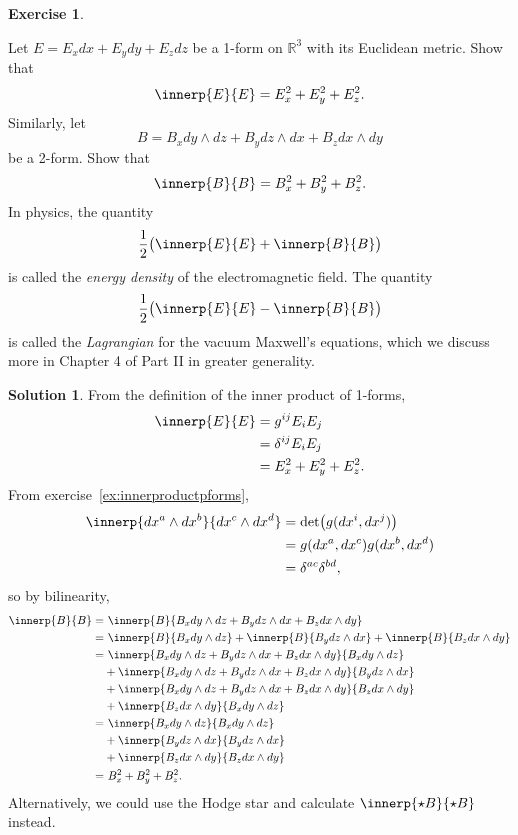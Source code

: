 \documentclass[11pt, a4paper]{report}
\theoremstyle{definition}
\newtheorem{ex}{Exercise}[part]
\newtheorem{sol}{Solution}[part]
\begin{document}
\begin{ex}\label{ex:esquaredbsquared}

Let $E = E_x dx + E_y dy + E_z dz$ be a 1-form on $\mathbb{R}^3$ with its Euclidean metric. Show that
\[
    \innerp{E}{E} = E_x^2 + E_y^2 + E_z^2.
\]
Similarly, let
\[
    B = B_x dy \wedge dz + B_y dz \wedge dx + B_z dx \wedge dy
\]
be a 2-form. Show that
\[
    \innerp{B}{B} = B_x^2 + B_y^2 + B_z^2.
\]
In physics, the quantity
\[
    \frac{1}{2} \bigl( \innerp{E}{E} + \innerp{B}{B} \bigr)
\]
is called the \emph{energy density} of the electromagnetic field. The quantity
\[
    \frac{1}{2} \bigl( \innerp{E}{E} - \innerp{B}{B} \bigr) \label{eq:lagrangianvacuumem}
\]
is called the \emph{Lagrangian} for the vacuum Maxwell's equations, which we discuss more in Chapter 4 of Part II in greater generality.

\end{ex}

\begin{sol}

From the definition of the inner product of 1-forms,
\begin{align*}
    \innerp{E}{E} &= g^{ij} E_i E_j \\
                  &= \delta^{ij} E_i E_j \\
                  &= E_x^2 + E_y^2 + E_z^2.
\end{align*}
From exercise~\ref{ex:innerproductpforms},
\begin{align*}
    \innerp{dx^a \wedge dx^b}{dx^c \wedge dx^d} &= \det \bigl(g(dx^i, dx^j)\bigr) \\
        &= g(dx^a, dx^c) g(dx^b, dx^d) \\
        &= \delta^{ac} \delta^{bd},
\end{align*}
so by bilinearity,
\begin{align*}
    \innerp{B}{B} =&\ \innerp{B}{B_x dy \wedge dz + B_y dz \wedge dx + B_z dx \wedge dy} \\
        =&\ \innerp{B}{B_x dy \wedge dz}
            + \innerp{B}{B_y dz \wedge dx}
            + \innerp{B}{B_z dx \wedge dy} \\
        =&\ \innerp{B_x dy \wedge dz + B_y dz \wedge dx + B_z dx \wedge dy}
                   {B_x dy \wedge dz} \\
        &+ \innerp{B_x dy \wedge dz + B_y dz \wedge dx + B_z dx \wedge dy}
                  {B_y dz \wedge dx} \\
        &+ \innerp{B_x dy \wedge dz + B_y dz \wedge dx + B_z dx \wedge dy}
                  {B_z dx \wedge dy} \\
        &+ \innerp{B_z dx \wedge dy}{B_x dy \wedge dz} \\
        =&\ \innerp{B_x dy \wedge dz}{B_x dy \wedge dz} \\
        &+ \innerp{B_y dz \wedge dx}{B_y dz \wedge dx} \\
        &+ \innerp{B_z dx \wedge dy}{B_z dx \wedge dy} \\
        =&\ B_x^2 + B_y^2 + B_z^2.
\end{align*}
Alternatively, we could use the Hodge star and calculate $\innerp{\star B}{\star B}$ instead.

\end{sol}
\end{document}
